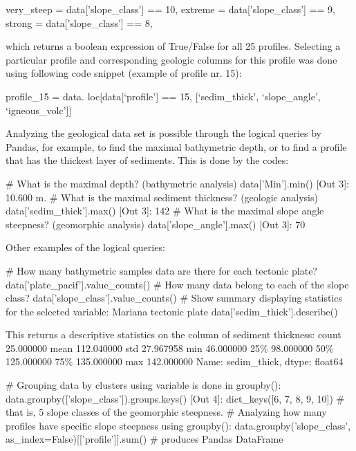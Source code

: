\documentclass[11pt,a4paper]{report}
\begin{document}
{\begin{python}
very_steep = data['slope_class'] == 10,
extreme = data['slope_class'] == 9,
strong = data['slope_class'] == 8,
\end{python}

which returns a boolean expression of True/False for all 25 profiles. Selecting a particular profile and corresponding geologic columns for this profile was done using following code snippet (example of profile nr. 15):

\begin{python}
profile_15 = data. loc[data[‘profile’] == 15, [‘sedim_thick’, ‘slope_angle’, ‘igneous_volc’]]
\end{python}

Analyzing the geological data set is possible through the logical queries by Pandas, for example, to find the maximal bathymetric depth, or to find a profile that has the thickest layer of sediments. This is done by the codes:

\begin{python}
	# What is the maximal depth? (bathymetric analysis)
data['Min'].min()  
[Out 3]: 10.600 m. 
	# What is the maximal sediment thickness? (geologic analysis)
data['sedim_thick'].max()
[Out 3]:  142
	# What is the maximal slope angle steepness? (geomorphic analysis)
data['slope_angle'].max()
[Out 3]:  70
\end{python}

Other examples of the logical queries:
\begin{python}
	# How many bathymetric samples data are there for each tectonic plate? 
data['plate_pacif'].value_counts()
	# How many data belong to each of the slope class? 
data['slope_class'].value_counts()
	# Show summary displaying statistics for the selected variable: Mariana tectonic plate 
data['sedim_thick'].describe()
\end{python}
This returns a descriptive statistics on the column of sediment thickness:
count     25.000000 
mean     112.040000 
std       27.967958 
min       46.000000 
25\%       98.000000 
50\%      125.000000 
75\%      135.000000 
max      142.000000 
Name: sedim\_thick,  dtype: float64

\begin{python}
	# Grouping data by clusters using variable is done in groupby():
data.groupby(['slope_class']).groups.keys()
[Out 4]: dict_keys([6, 7, 8, 9, 10]) # that is, 5 slope classes of the geomorphic steepness.
	# Analyzing how many profiles have specific slope steepness using groupby(): 
data.groupby('slope_class', as_index=False)[['profile']].sum() # produces Pandas DataFrame 
\end{python}	

}
\end{document}
